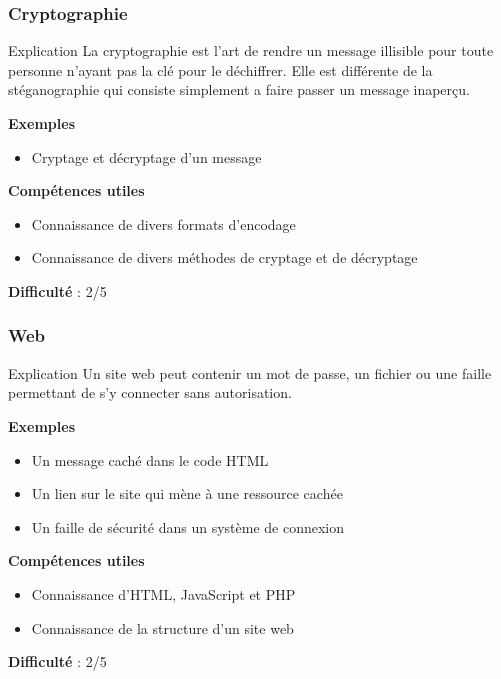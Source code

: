 \documentclass{beamer}
\begin{document}

\begin{frame}
\frametitle{Cryptographie}

\begin{block}{Explication}
    La cryptographie est l'art de rendre un message illisible pour toute personne n'ayant pas la clé pour le déchiffrer. Elle est différente de la stéganographie qui consiste simplement a faire passer un message inaperçu.
\end{block}

\pause

\textbf{Exemples}
\begin{itemize}
    \item Cryptage et décryptage d'un message 
\end{itemize}

\pause

\textbf{Compétences utiles}
\begin{itemize}
    \item Connaissance de divers formats d'encodage
    \item Connaissance de divers méthodes de cryptage et de décryptage
\end{itemize}

\pause

\textbf{Difficulté} : 2/5

\end{frame}


\begin{frame}
\frametitle{Web}


\begin{block}{Explication}
    Un site web peut contenir un mot de passe, un fichier ou une faille permettant de s'y connecter sans autorisation.
\end{block}

\pause

\textbf{Exemples}
\begin{itemize}
    \item Un message caché dans le code HTML
    \item Un lien sur le site qui mène à une ressource cachée
    \item Un faille de sécurité dans un système de connexion
\end{itemize}

\pause

\textbf{Compétences utiles}
\begin{itemize}
    \item Connaissance d'HTML, JavaScript et PHP
    \item Connaissance de la structure d'un site web
\end{itemize}

\pause

\textbf{Difficulté} : 2/5

\end{frame}
\end{document}
